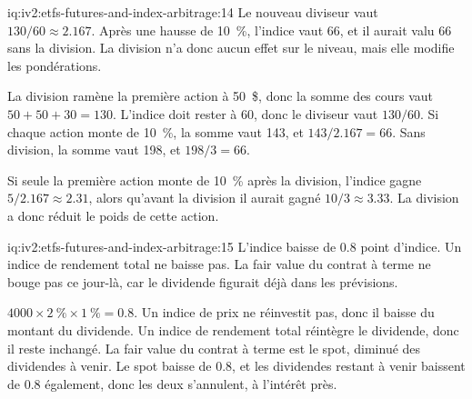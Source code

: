 \begin{solution}{iq:iv2:etfs-futures-and-index-arbitrage:14}
Le nouveau diviseur vaut $130/60 \approx 2.167$. Après une hausse de 10~\%, l'indice vaut 66, et il aurait valu 66 sans la division. La division n'a donc aucun effet sur le niveau, mais elle modifie les pondérations.

La division ramène la première action à 50~\$, donc la somme des cours vaut $50 + 50 + 30 = 130$. L'indice doit rester à 60, donc le diviseur vaut $130/60$. Si chaque action monte de 10~\%, la somme vaut 143, et $143/2.167 = 66$. Sans division, la somme vaut 198, et $198/3 = 66$.

Si seule la première action monte de 10~\% après la division, l'indice gagne $5/2.167 \approx 2.31$, alors qu'avant la division il aurait gagné $10/3 \approx 3.33$. La division a donc réduit le poids de cette action.

\end{solution}

\begin{solution}{iq:iv2:etfs-futures-and-index-arbitrage:15}
L'indice baisse de 0.8 point d'indice. Un indice de rendement total ne baisse pas. La fair value du contrat à terme ne bouge pas ce jour-là, car le dividende figurait déjà dans les prévisions.

$4000 \times 2~\% \times 1~\% = 0.8$. Un indice de prix ne réinvestit pas, donc il baisse du montant du dividende. Un indice de rendement total réintègre le dividende, donc il reste inchangé. La fair value du contrat à terme est le spot, diminué des dividendes à venir. Le spot baisse de 0.8, et les dividendes restant à venir baissent de 0.8 également, donc les deux s'annulent, à l'intérêt près.

\end{solution}

